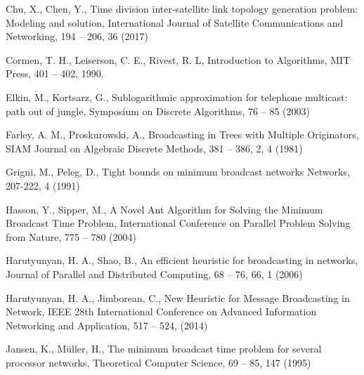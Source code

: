 



\begin{thebibliography}{}
%
%
Chu, X., Chen, Y.,
Time division inter‐satellite link topology generation problem: Modeling and solution,
International Journal of Satellite Communications and Networking, 194 -- 206, 36 (2017)

Cormen, T. H., Leiserson, C. E., Rivest, R. L,
Introduction to Algorithms, 
MIT Press, 401 -- 402, 1990. 

Elkin, M., Kortsarz, G.,
Sublogarithmic approximation for telephone multicast: path out of jungle,
Symposium on Discrete Algorithms, 76 -- 85 (2003)

Farley, A. M., Proskurowski, A.,
Broadcasting in Trees with Multiple Originators,
SIAM Journal on Algebraic Discrete Methods, 381 -- 386, 2, 4 (1981)

Grigni, M., Peleg, D.,
Tight bounds on minimum broadcast networks
Networks, 207-222, 4 (1991)

Hasson, Y., Sipper, M.,
A Novel Ant Algorithm for Solving the Minimum Broadcast Time Problem,
International Conference on Parallel Problem Solving from Nature, 775 -- 780 (2004)

Harutyunyan, H. A., Shao, B.,
An efficient heuristic for broadcasting in networks,
Journal of Parallel and Distributed Computing, 68 -- 76, 66, 1 (2006)

Harutyunyan, H. A., Jimborean, C.,
New Heuristic for Message Broadcasting in Network,
IEEE 28th International Conference on Advanced Information Networking and Application, 517 -- 524, (2014)

Jansen, K., M\"uller, H.,
The minimum broadcast time problem for several processor networks, 
Theoretical Computer Science, 69 -- 85, 147 (1995)


\end{thebibliography}
